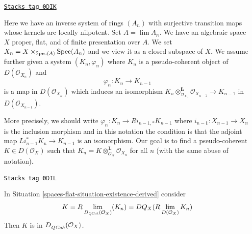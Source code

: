 \begin{definition}
\label{spaces-flat-situation-existence-derived}
\href{https://stacks.math.columbia.edu/tag/0DIK}{\texttt{Stacks tag 0DIK}}

Here we have an inverse system of rings $(A_n)$ with surjective transition
maps whose kernels are locally nilpotent. Set $A = \lim A_n$. We have an
algebraic space $X$ proper, flat, and of finite presentation over $A$.
We set $X_n = X \times_{\operatorname{Spec}(A)} \operatorname{Spec}(A_n)$ and we
view it as a closed subspace of $X$. We assume further given a system
$(K_n, \varphi_n)$ where $K_n$ is a pseudo-coherent object of
$D(\mathcal{O}_{X_n})$ and
$$
\varphi_n : K_n \longrightarrow K_{n - 1}
$$
is a map in $D(\mathcal{O}_{X_n})$ which induces an isomorphism
$K_n \otimes_{\mathcal{O}_{X_n}}^\mathbf{L} \mathcal{O}_{X_{n - 1}}
\to K_{n - 1}$ in $D(\mathcal{O}_{X_{n - 1}})$.
\end{definition}

More precisely, we should write
$\varphi_n : K_n \to Ri_{n - 1, *}K_{n - 1}$
where $i_{n - 1} : X_{n - 1} \to X_n$ is the inclusion morphism
and in this notation the condition is that the adjoint
map $Li_{n - 1}^*K_n \to K_{n - 1}$ is an isomorphism.
Our goal is to find a pseudo-coherent $K \in D(\mathcal{O}_X)$
such that $K_n = K \otimes_{\mathcal{O}_X}^\mathbf{L} \mathcal{O}_{X_n}$
for all $n$ (with the same abuse of notation).

\begin{lemma}
\label{spaces-flat-lemma-compute-what-it-should-be-derived}
\href{https://stacks.math.columbia.edu/tag/0DIL}{\texttt{Stacks tag 0DIL}}

In Situation \ref{spaces-flat-situation-existence-derived} consider
$$
K = R\lim_{D_{\mathit{QCoh}}(\mathcal{O}_X)}(K_n) =
DQ_X(R\lim_{D(\mathcal{O}_X)} K_n)
$$
Then $K$ is in $D^-_{\mathit{QCoh}}(\mathcal{O}_X)$.
\end{lemma}

